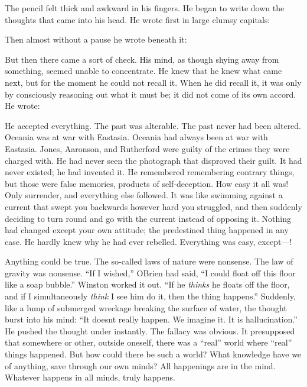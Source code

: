 The pencil felt thick and awkward in his fingers. He began to write down
the thoughts that came into his head. He wrote first in large clumsy
capitals:


Then almost without a pause he wrote beneath it:


But then there came a sort of check. His mind, as though shying away
from something, seemed unable to concentrate. He knew that he knew what
came next, but for the moment he could not recall it. When he did recall
it, it was only by consciously reasoning out what it must be; it did not
come of its own accord. He wrote:


He accepted everything. The past was alterable. The past never had been
altered. Oceania was at war with Eastasia. Oceania had always been at
war with Eastasia. Jones, Aaronson, and Rutherford were guilty of the
crimes they were charged with. He had never seen the photograph that
disproved their guilt. It had never existed; he had invented it. He
remembered remembering contrary things, but those were false memories,
products of self-deception. How easy it all was! Only surrender, and
everything else followed. It was like swimming against a current that
swept you backwards however hard you struggled, and then suddenly
deciding to turn round and go with the current instead of opposing it.
Nothing had changed except your own attitude; the predestined thing
happened in any case. He hardly knew why he had ever rebelled.
Everything was easy, except---!

Anything could be true. The so-called laws of nature were nonsense. The
law of gravity was nonsense. ``If I wished,'' O\textquotesingle Brien had
said, ``I could float off this floor like a soap bubble.'' Winston worked
it out. ``If he \emph{thinks} he floats off the floor, and if I
simultaneously \emph{think} I see him do it, then the thing happens.''
Suddenly, like a lump of submerged wreckage breaking the surface of
water, the thought burst into his mind: ``It doesn\textquotesingle t
really happen. We imagine it. It is hallucination.'' He pushed the
thought under instantly. The fallacy was obvious. It presupposed that
somewhere or other, outside oneself, there was a ``real'' world where
``real'' things happened. But how could there be such a world? What
knowledge have we of anything, save through our own minds? All
happenings are in the mind. Whatever happens in all minds, truly
happens.

